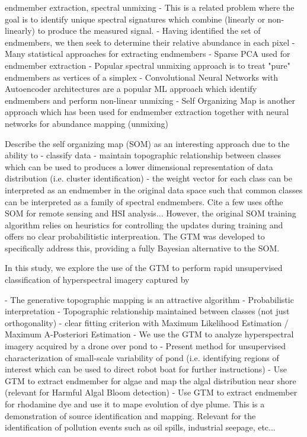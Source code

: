 \documentclass{article}
\begin{document}
endmember extraction, spectral unmixing
- This is a related problem where the goal is to identify unique spectral signatures which combine (linearly or non-linearly) to produce the measured signal.
- Having identified the set of endmembers, we then seek to determine their relative abundance in each pixel
- Many statistical approaches for extracting endmembers \cite{berman2004ice}
- Sparse PCA used for endmember extraction \cite{yousefi2016mineral}
- Popular spectral unmixing approach is to treat "pure" endmembers as vertices of a simplex \cite{plaza2012endmember, nascimento2005vertex}
- Convolutional Neural Networks with Autoencoder architectures are a popular ML approach which identify endmembers and perform non-linear unmixing \cite{palsson2020convolutional, non-negative-autoencoders, su2019daen, borsoi2019deep}
- Self Organizing Map is another approach which has been used for endmember extraction together with neural networks for abundance mapping (unmixing) \cite{cantero2004analysis}





Describe the self organizing map (SOM) as an interesting approach due to the ability to 
    - classify data 
    - maintain topographic relationship between classes which can be used to produces a lower dimensional representation of data distribution (i.e. cluster identification)
    - the weight vector for each class can be interpreted as an endmember in the original data space such that common classes can be interpreted as a family of spectral endmembers.
Cite a few uses ofthe SOM for remote sensing and HSI analysis...
However, the original SOM training algorithm relies on heuristics for controlling the updates during training and offers no clear probabilitistic interpreation. The GTM was developed to specifically address this, providing a fully Bayesian alternative to the SOM.


In this study, we explore the use of the GTM to perform rapid unsupervised classification of hyperspectral imagery captured by 

    - The generative topographic mapping is an attractive algorithm 
        - Probabilistic interpretation
        - Topographic relationship maintained between classes (not just orthogonality)
        - clear fitting criterion with Maximum Likelihood Estimation / Maximum A-Posteriori Estimation
    - We use the GTM to analyze hyperspectral imagery acquired by a drone over pond to 
        - Present method for unsupervised characterization of small-scale variability of pond (i.e. identifying regions of interest which can be used to direct robot boat for further instructions) 
        - Use GTM to extract endmember for algae and map the algal distribution near shore (relevant for Harmful Algal Bloom detection)
        - Use GTM to extract endmember for rhodamine dye and use it to mape evolution of dye plume. This is a demonstration of source identification and mapping. Relevant for the identification of pollution events such as oil spills, industrial seepage, etc...
\end{document}
